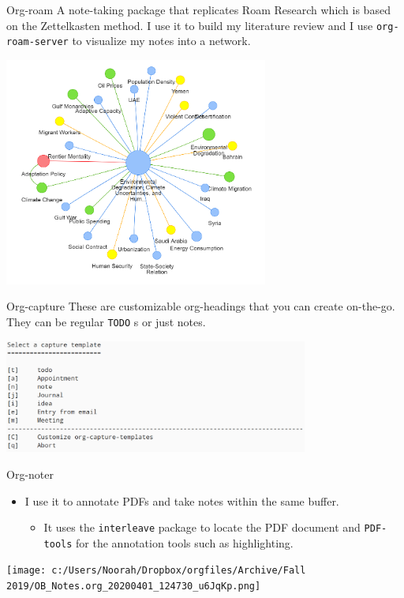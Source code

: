 \documentclass[presentation]{beamer}
\begin{document}
\begin{frame}[label={sec:org3fb2a23},fragile]{Org-roam}
 A note-taking package that replicates Roam Research which is based on the Zettelkasten method. I use it to build my literature review and I use \texttt{org-roam-server} to visualize my notes into a network.


\begin{center}
\includegraphics[width=0.65\textwidth]{7.png}
\end{center}
\end{frame}

\begin{frame}[label={sec:org317d231},fragile]{Org-capture}
 These are customizable org-headings that you can create on-the-go. They can be regular \texttt{TODO} s or just notes.

\begin{center}
\includegraphics[width=0.75\textwidth]{6.png}
\end{center}
\end{frame}

\begin{frame}[label={sec:orgf5b8704},fragile]{Org-noter}
 \begin{itemize}
\item I use it to annotate PDFs and take notes within the same buffer.
\begin{itemize}
\item It uses the \texttt{interleave} package to locate the PDF document and \texttt{PDF-tools} for the annotation tools such as highlighting.
\end{itemize}
\end{itemize}

\begin{center}
\texttt{[image: c:/Users/Noorah/Dropbox/orgfiles/Archive/Fall 2019/OB\_Notes.org\_20200401\_124730\_u6JqKp.png]}
\end{center}
\end{frame}
\end{document}
